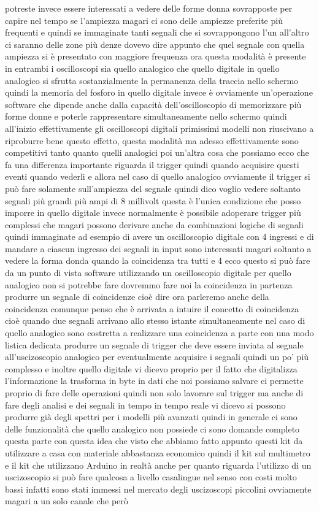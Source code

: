 {potreste invece essere interessati a vedere delle forme donna sovrapposte per capire nel tempo se l'ampiezza magari ci sono delle ampiezze preferite più frequenti e quindi se immaginate tanti segnali che si sovrappongono l'un all'altro ci saranno delle zone più denze dovevo dire appunto che quel segnale con quella ampiezza si è presentato con maggiore frequenza ora questa modalità è presente in entrambi i oscilloscopi sia quello analogico che quello digitale in quello analogico si sfrutta sostanzialmente la permanenza della traccia nello schermo quindi la memoria del fosforo in quello digitale invece è ovviamente un'operazione software che dipende anche dalla capacità dell'oscilloscopio di memorizzare più forme donne e poterle rappresentare simultaneamente nello schermo quindi all'inizio effettivamente gli oscilloscopi digitali primissimi modelli non riuscivano a riproburre bene questo effetto, questa modalità ma adesso effettivamente sono competitivi tanto quanto quelli analogici poi un'altra cosa che possiamo ecco che fa una differenza importante riguarda il trigger quindi quando acquisire questi eventi quando vederli e allora nel caso di quello analogico ovviamente il trigger si può fare solamente sull'ampiezza del segnale quindi dico voglio vedere soltanto segnali più grandi più ampi di 8 millivolt questa è l'unica condizione che posso imporre in quello digitale invece normalmente è possibile adoperare trigger più complessi che magari possono derivare anche da combinazioni logiche di segnali quindi immaginate ad esempio di avere un oscilloscopio digitale con 4 ingressi e di mandare a ciascun ingresso dei segnali in input sono interessati magari soltanto a vedere la forma donda quando la coincidenza tra tutti e 4 ecco questo si può fare da un punto di vista software utilizzando un oscilloscopio digitale per quello analogico non si potrebbe fare dovremmo fare noi la coincidenza in partenza produrre un segnale di coincidenze cioè dire ora parleremo anche della coincidenza comunque penso che è arrivata a intuire il concetto di coincidenza cioè quando due segnali arrivano allo stesso istante simultaneamente nel caso di quello analogico sono costretta a realizzare una coincidenza a parte con una modo listica dedicata produrre un segnale di trigger che deve essere inviata al segnale all'uscizoscopio analogico per eventualmente acquisire i segnali quindi un po' più complesso e inoltre quello digitale vi dicevo proprio per il fatto che digitalizza l'informazione la trasforma in byte in dati che noi possiamo salvare ci permette proprio di fare delle operazioni quindi non solo lavorare sul trigger ma anche di fare degli analisi e dei segnali in tempo in tempo reale vi dicevo si possono produrre già degli spettri per i modelli più avanzati quindi in generale ci sono delle funzionalità che quello analogico non possiede ci sono domande completo questa parte con questa idea che visto che abbiamo fatto appunto questi kit da utilizzare a casa con materiale abbastanza economico quindi il kit sul multimetro e il kit che utilizzano Arduino in realtà anche per quanto riguarda l'utilizzo di un uscizoscopio si può fare qualcosa a livello casalingue nel senso con costi molto bassi infatti sono stati immessi nel mercato degli uscizoscopi piccolini ovviamente magari a un solo canale che però }
